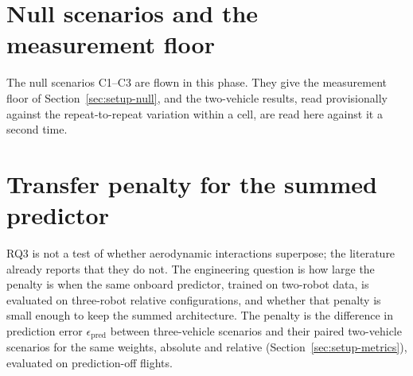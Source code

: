 
\section{Null scenarios and the measurement floor}
\label{sec:res3-null}

The null scenarios C1--C3 are flown in this phase. They give the measurement floor of
Section~\ref{sec:setup-null}, and the two-vehicle results, read provisionally against the
repeat-to-repeat variation within a cell, are read here against it a second time.


\section{Transfer penalty for the summed predictor}
\label{sec:res3-transfer}

RQ3 is not a test of whether aerodynamic interactions superpose; the literature already reports that
they do not. The engineering question is how large the penalty is when the same onboard predictor,
trained on two-robot data, is evaluated on three-robot relative configurations, and whether that
penalty is small enough to keep the summed architecture. The penalty is the difference in
prediction error $\epsilon_{\mathrm{pred}}$ between three-vehicle scenarios and their paired
two-vehicle scenarios for the same weights, absolute and relative
(Section~\ref{sec:setup-metrics}), evaluated on prediction-off flights.



